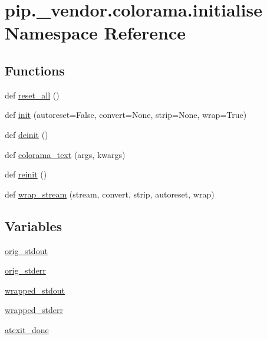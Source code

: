 \hypertarget{namespacepip_1_1__vendor_1_1colorama_1_1initialise}{}\section{pip.\+\_\+vendor.\+colorama.\+initialise Namespace Reference}
\label{namespacepip_1_1__vendor_1_1colorama_1_1initialise}
\subsection*{Functions}
\begin{DoxyCompactItemize}
\item 
def \hyperlink{namespacepip_1_1__vendor_1_1colorama_1_1initialise_a09aa5c4f14fed23baee4a46e7944d887}{reset\+\_\+all} ()
\item 
def \hyperlink{namespacepip_1_1__vendor_1_1colorama_1_1initialise_ad1016224e06477ebaf9ef7a830678900}{init} (autoreset=False, convert=None, strip=None, wrap=True)
\item 
def \hyperlink{namespacepip_1_1__vendor_1_1colorama_1_1initialise_adfbdad454424feec0daec9c0f40b27e0}{deinit} ()
\item 
def \hyperlink{namespacepip_1_1__vendor_1_1colorama_1_1initialise_a6727248ff80519eb08bb660d72e3c858}{colorama\+\_\+text} (args, kwargs)
\item 
def \hyperlink{namespacepip_1_1__vendor_1_1colorama_1_1initialise_aea40e8983db928afa5ed5e002b32cbb9}{reinit} ()
\item 
def \hyperlink{namespacepip_1_1__vendor_1_1colorama_1_1initialise_a3408a962da1cd013d5445d819a4aac46}{wrap\+\_\+stream} (stream, convert, strip, autoreset, wrap)
\end{DoxyCompactItemize}
\subsection*{Variables}
\begin{DoxyCompactItemize}
\item 
\hyperlink{namespacepip_1_1__vendor_1_1colorama_1_1initialise_a571ceae67dbbbbf3f9ffbe099f6cf040}{orig\+\_\+stdout}
\item 
\hyperlink{namespacepip_1_1__vendor_1_1colorama_1_1initialise_af946f7947cfe05393c88a7e3cc6c6c3a}{orig\+\_\+stderr}
\item 
\hyperlink{namespacepip_1_1__vendor_1_1colorama_1_1initialise_abde8110a03694c1b85b3c3c7e4b6c216}{wrapped\+\_\+stdout}
\item 
\hyperlink{namespacepip_1_1__vendor_1_1colorama_1_1initialise_aefe07608824bf7cdba9b7dc54378164b}{wrapped\+\_\+stderr}
\item 
\hyperlink{namespacepip_1_1__vendor_1_1colorama_1_1initialise_ae650620a01dc1abc99b76f3854ab99b1}{atexit\+\_\+done}
\end{DoxyCompactItemize}


